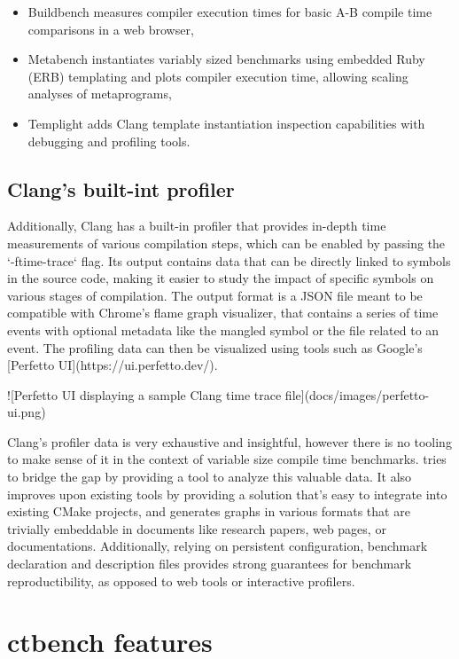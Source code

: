 \documentclass[../../main.tex]{subfiles}
\begin{document}
\begin{itemize}
\item Buildbench\cite{buildbench} measures compiler execution times for basic
      A-B compile time comparisons in a web browser,
\item Metabench\cite{metabench} instantiates variably sized benchmarks using embedded
      Ruby (ERB) templating and plots compiler execution time, allowing scaling
      analyses of metaprograms,
\item Templight\cite{templight} adds Clang template instantiation inspection
      capabilities with debugging and profiling tools.
\end{itemize}

\subsection{Clang's built-int profiler}

Additionally, Clang has a built-in profiler\cite{time-trace} that provides in-depth
time measurements of various compilation steps, which can be enabled by passing
the `-ftime-trace` flag. Its output contains data that can be directly linked to
symbols in the source code, making it easier to study the impact of specific
symbols on various stages of compilation. The output format is a JSON file meant
to be compatible with Chrome's flame graph visualizer, that contains a series of
time events with optional metadata like the mangled \cpp symbol or the file
related to an event. The profiling data can then be visualized using tools such
as Google's [Perfetto UI](https://ui.perfetto.dev/).

![Perfetto UI displaying a sample Clang time trace file](docs/images/perfetto-ui.png)

Clang's profiler data is very exhaustive and insightful, however there is no
tooling to make sense of it in the context of variable size compile time
benchmarks. \ctbench tries to bridge the gap by providing a tool to analyze
this valuable data. It also improves upon existing tools by providing a solution
that's easy to integrate into existing CMake projects, and generates graphs in
various formats that are trivially embeddable in documents like research papers,
web pages, or documentations. Additionally, relying on persistent configuration,
benchmark declaration and description files provides strong guarantees for
benchmark reproductibility, as opposed to web tools or interactive profilers.

\section{ctbench features}
\end{document}
